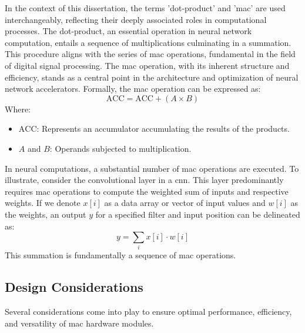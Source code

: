 In the context of this dissertation, the terms 'dot-product' and '\gls{mac}' are used interchangeably, reflecting their deeply associated roles in computational processes. The dot-product, an essential operation in neural network computation, entails a sequence of multiplications culminating in a summation. This procedure aligns with the series of \gls{mac} operations, fundamental in the field of digital signal processing. The \gls{mac} operation, with its inherent structure and efficiency, stands as a central point in the architecture and optimization of neural network accelerators. Formally, the \gls{mac} operation can be expressed as:
\begin{equation}
\text{ACC} = \text{ACC} + (A \times B)
\end{equation}
Where:
\begin{itemize}
	\item \( \text{ACC} \): Represents an accumulator accumulating the results of the products.
	\item \( A \) and \( B \): Operands subjected to multiplication.
\end{itemize}

In neural computations, a substantial number of \gls{mac} operations are executed. To illustrate, consider the convolutional layer in a \gls{cnn}. This layer predominantly requires \gls{mac} operations to compute the weighted sum of inputs and respective weights. If we denote \( x[i] \) as a data array or vector of input values and \( w[i] \) as the weights, an output \( y \) for a specified filter and input position can be delineated as:
\begin{equation}
y = \sum_{i} x[i] \cdot w[i]
\end{equation}
This summation is fundamentally a sequence of \gls{mac} operations.

\subsection{Design Considerations}
Several considerations come into play to ensure optimal performance, efficiency, and versatility of \gls{mac} hardware modules.

